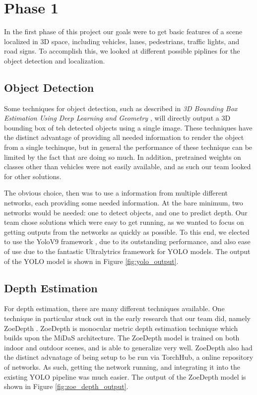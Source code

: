 \section{Phase 1}
In the first phase of this project our goals were to get basic features of a scene localized in 3D space, including vehicles, lanes, pedestrians, traffic lights, and road signs. To accomplish this, we looked at different possible piplines for the object detection and localization.

\subsection{Object Detection}
Some techniques for object detection, such as described in \emph{3D Bounding Box Estimation Using Deep Learning and Geometry} \cite{3DBoxEstimation}, will directly output a 3D bounding box of teh detected objects using a single image. These techniques have the distinct advantage of providing all needed information to render the object from a single techinque, but in general the performance of these technique can be limited by the fact that are doing so much. In addition, pretrained weights on classes other than vehicles were not easily available, and as such our team looked for other solutions.

The obvious choice, then was to use a information from multiple different networks, each providing some needed information. At the bare minimum, two networks would be needed: one to detect objects, and one to predict depth. Our team chose solutions which were easy to get running, as we wanted to focus on getting outputs from the networks as quickly as possible. To this end, we elected to use the YoloV9 framework \cite{YOLOv9}, due to its outstanding performance, and also ease of use due to the fantastic Ultralytrics framework for YOLO models. The output of the YOLO model is shown in Figure \ref{fig:yolo_output}.


\subsection{Depth Estimation}
For depth estimation, there are many different techniques available. One technique in particular stuck out in the early research that our team did, namely ZoeDepth \cite{ZoeDepth}. ZoeDepth is monocular metric depth estimation technique which builds upon the MiDaS architecture. The ZoeDepth model is trained on both indoor and outdoor scenes, and is able to generalize very well. ZoeDepth also had the distinct advnatage of being setup to be run via TorchHub, a online repository of networks. As such, getting the network running, and integrating it into the existing YOLO pipeline was much easier. The output of the ZoeDepth model is shown in Figure \ref{fig:zoe_depth_output}.


